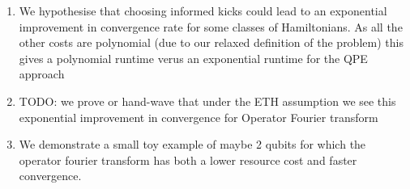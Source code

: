 \documentclass[10pt]{amsart}
\begin{document}
\begin{enumerate}
\begin{enumerate}
        \item We hypothesise that choosing informed kicks could lead to an exponential improvement in convergence rate for some classes of Hamiltonians. As all the other costs are polynomial (due to our relaxed definition of the problem) this gives a polynomial runtime verus an exponential runtime for the QPE approach
        \item TODO: we prove or hand-wave that under the ETH assumption we see this exponential improvement in convergence for Operator Fourier transform
        \item We demonstrate a small toy example of maybe 2 qubits for which the operator fourier transform has both a lower resource cost and faster convergence.
    \end{enumerate}
\end{enumerate}
\end{document}
